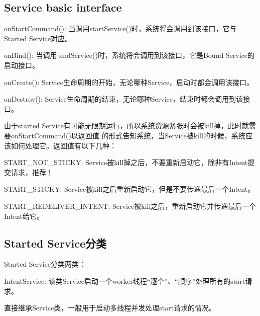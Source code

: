 ﻿\documentclass[a4paper,11pt]{article}
\begin{document}
  \subsection[Service basic interface]{Service basic interface}
  \begin{coloredenumerate}
    \item onStartCommand(): 当调用startService()时，系统将会调用到该接口，它与Started Service对应。
    \item onBind(): 当调用bindService()时，系统将会调用到该接口，它是Bound Service的启动接口。
    \item onCreate(): Service生命周期的开始，无论哪种Service，启动时都会调用该接口。
    \item onDestroy(): Service生命周期的结束，无论哪种Service，结束时都会调用到该接口。
  \end{coloredenumerate}

  由于started Service有可能无限期运行，所以系统资源紧张时会被kill掉，此时就需要onStartCommand()以返回值
  的形式告知系统，当Service被kill的时候，系统应该如何处理它。返回值有以下几种：\par
  \begin{coloredenumerate}
    \item START\_NOT\_STICKY: Service被kill掉之后，不要重新启动它，除非有Intent提交请求，推荐！
    \item START\_STICKY: Service被kill之后重新启动它，但是不要传递最后一个Intent。
    \item START\_REDELIVER\_INTENT: Service被kill之后，重新启动它并传递最后一个Intent给它。
  \end{coloredenumerate}

  \subsection[Started Service分类]{Started Service分类}
  Started Service分类两类：\par
  \begin{coloredenumerate}
    \item IntentService: 该类Service启动一个worker线程“逐个”、“顺序”处理所有的start请求。
    \item 直接继承Service类，一般用于启动多线程并发处理start请求的情况。
  \end{coloredenumerate}
\end{document}
